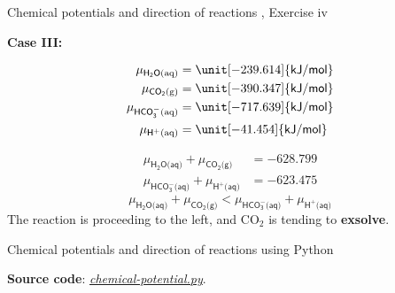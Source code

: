 %
%
\begin{frame}{Chemical potentials and direction of reactions , Exercise \; iv}

\textbf{Case III: }

\lcol
\begin{align*}
\mu_{\mathsf{H_{2}O\text{(aq)}}} & =\unit[-239.614]{\mathsf{kJ/mol}}\\
\mu_{\mathsf{CO_{2}\text{(g)}}} & =\unit[-390.347]{\mathsf{kJ/mol}}\\
\mu_{\mathsf{HCO_{3}^{-}\text{(aq)}}} & =\unit[-717.639]{\mathsf{kJ/mol}}\\
\mu_{\mathsf{H^{+}\text{(aq)}}} & =\unit[-41.454]{\mathsf{kJ/mol}}
\end{align*}
\rcol

\begin{align*}
\mu_{\mathsf{H_{2}O\text{(aq)}}}+\mu_{\mathsf{CO_{2}\text{(g)}}} & =-628.799\\
\mu_{\mathsf{HCO_{3}^{-}\text{(aq)}}}+\mu_{\mathsf{H^{+}\text{(aq)}}} & =-623.475
\end{align*}
\[
\boxed{\mu_{\mathsf{H_{2}O\text{(aq)}}}+\mu_{\mathsf{CO_{2}\text{(g)}}}<\mu_{\mathsf{HCO_{3}^{-}\text{(aq)}}}+\mu_{\mathsf{H^{+}\text{(aq)}}}}
\]
The reaction is proceeding to the left, and CO$_{2}$ is tending to
\textbf{exsolve}.

\ecol
\end{frame}
%
%
\begin{frame}[fragile]{Chemical potentials and direction of reactions using Python}

\textbf{Source code}: \href{https://polybox.ethz.ch/index.php/s/4kiqklmnBtXs3pG}{\textcolor{indigo(dye)}{\it chemical-potential.py}}.


%
%
\end{frame}
